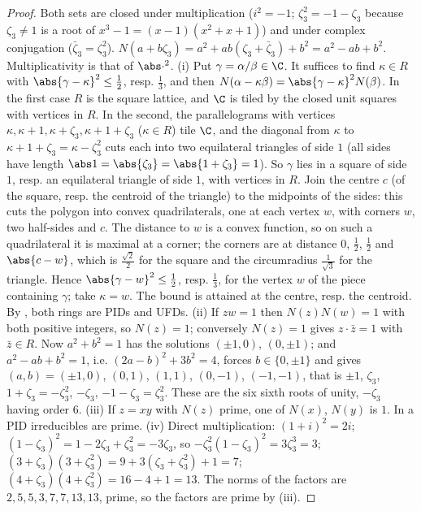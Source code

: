 \begin{proof}
Both sets are closed under multiplication ($i^2=-1$; $\zeta_3^2=-1-\zeta_3$ because $\zeta_3\ne1$ is a root of $x^3-1=(x-1)(x^2+x+1)$) and
under complex conjugation ($\bar\zeta_3=\zeta_3^2$). $N(a+b\zeta_3)=a^2+ab(\zeta_3+\bar\zeta_3)+b^2=a^2-ab+b^2$. Multiplicativity is that of $\abs\cdot^2$.
(i) Put $\gamma=\alpha/\beta\in\C$. It suffices to find $\kappa\in R$ with $\abs{\gamma-\kappa}^2\le\frac12$, resp. $\frac13$, and then
$N(\alpha-\kappa\beta)=\abs{\gamma-\kappa}^2N(\beta)$. In the first case $R$ is the square lattice, and $\C$ is tiled by the closed unit squares with
vertices in $R$. In the second, the parallelograms with vertices $\kappa,\kappa+1,\kappa+\zeta_3,\kappa+1+\zeta_3$ ($\kappa\in R$) tile $\C$, and the
diagonal from $\kappa$ to $\kappa+1+\zeta_3=\kappa-\zeta_3^2$ cuts each into two equilateral triangles of side $1$ (all sides have length $\abs1=\abs{\zeta_3}=\abs{1+\zeta_3}=1$).
So $\gamma$ lies in a square of side $1$, resp. an equilateral triangle of side $1$, with vertices in $R$. Join the centre $c$
(of the square, resp. the centroid of the triangle) to the midpoints of the sides: this cuts the polygon into convex
quadrilaterals, one at each vertex $w$, with corners $w$, two half-sides and $c$. The distance to $w$ is a convex function,
so on such a quadrilateral it is maximal at a corner; the corners are at distance $0$, $\frac12$, $\frac12$ and $\abs{c-w}$, which is
$\frac{\sqrt2}2$ for the square and the circumradius $\frac1{\sqrt3}$ for the triangle. Hence $\abs{\gamma-w}^2\le\frac12$, resp. $\frac13$, for the vertex $w$ of
the piece containing $\gamma$; take $\kappa=w$. The bound is attained at the centre, resp. the centroid. By
, both rings are PIDs and UFDs.
(ii) If $zw=1$ then $N(z)N(w)=1$ with both positive integers, so $N(z)=1$; conversely $N(z)=1$ gives $z\cdot\bar z=1$ with $\bar z\in R$. Now
$a^2+b^2=1$ has the solutions $(\pm1,0)$, $(0,\pm1)$; and $a^2-ab+b^2=1$, i.e. $(2a-b)^2+3b^2=4$, forces $b\in\{0,\pm1\}$ and gives $(a,b)=(\pm1,0)$, $(0,1)$,
$(1,1)$, $(0,-1)$, $(-1,-1)$, that is $\pm1$, $\zeta_3$, $1+\zeta_3=-\zeta_3^2$, $-\zeta_3$, $-1-\zeta_3=\zeta_3^2$. These are the six sixth roots of unity, $-\zeta_3$ having
order $6$.
(iii) If $z=xy$ with $N(z)$ prime, one of $N(x)$, $N(y)$ is $1$. In a PID irreducibles are prime.
(iv) Direct multiplication: $(1+i)^2=2i$; $(1-\zeta_3)^2=1-2\zeta_3+\zeta_3^2=-3\zeta_3$, so $-\zeta_3^2(1-\zeta_3)^2=3\zeta_3^3=3$; $(3+\zeta_3)(3+\zeta_3^2)=9+3(\zeta_3+\zeta_3^2)+1=7$;
$(4+\zeta_3)(4+\zeta_3^2)=16-4+1=13$. The norms of the factors are $2,5,5,3,7,7,13,13$, prime, so the factors are prime by (iii).
\end{proof}


